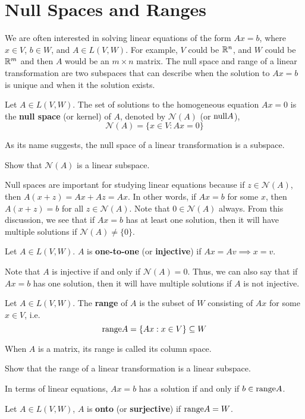 \section{Null Spaces and Ranges}

We are often interested in solving linear equations of the form $A x =
b$, where $x \in V$, $b \in W$, and $A \in L(V,W)$. For example, $V$
could be $\mathbb{R}^n$, and $W$ could be $\mathbb{R}^m$ and then $A$ would be an $m
\times n$ matrix. The null space and range of a linear transformation
are two subspaces that can describe when the solution to $Ax=b$ is
unique and when it the solution exists.

\begin{definition}
  Let $A \in L(V,W)$. The set of solutions to the homogeneous
  equation $Ax = 0$ is the \textbf{null space} (or kernel) of
  $A$, denoted by $\mathcal{N}(A)$ (or $\mathrm{null} A$),
  \[ \mathcal{N}(A) = \{x \in V: Ax = 0 \} \]
\end{definition}
As its name suggests, the null space of a linear transformation is a
subspace.
\begin{exercise}
  Show that $\mathcal{N}(A)$ is a linear subspace.
\end{exercise}
Null spaces are important for studying linear equations because if
$z \in \mathcal{N}(A)$, then $A (x + z) = Ax + A z = Ax$. In other
words, if $Ax = b$ for some $x$, then $A(x+z) = b$ for all
$z \in \mathcal{N}(A)$. Note that $0 \in \mathcal{N}(A)$ always. From
this discussion, we see that if $A x = b$ has at least one solution,
then it will have multiple solutions if $\mathcal{N}(A) \neq \{0 \}$.
\begin{definition}
  Let $A \in L(V,W)$. $A$ is \textbf{one-to-one} (or
  \textbf{injective}) if $Ax = A v \implies x = v$.
\end{definition}
Note that $A$ is injective if and only if $\mathcal{N}(A) = 0$. Thus,
we can also say that if $A x = b$ has one solution, then it will have
multiple solutions if $A$ is not injective.

\begin{definition}
  Let $A \in L(V,W)$. The \textbf{range} of $A$ is the subset of $W$
  consisting of $A x$ for some $x \in V$, i.e.
  \[ \mathrm{range} A = \{ Ax: x \in V \} \subseteq W \]
\end{definition}
When $A$ is a matrix, its range is called its column space. 
\begin{exercise}
  Show that the range of a linear transformation is a linear subspace.
\end{exercise}
In terms of linear equations, $Ax = b$ has a solution if and only if
$b \in \mathrm{range} A$. 
\begin{definition}
  Let $A \in L(V,W)$, $A$ is \textbf{onto} (or \textbf{surjective}) if
  $\mathrm{range} A = W$.
\end{definition}

